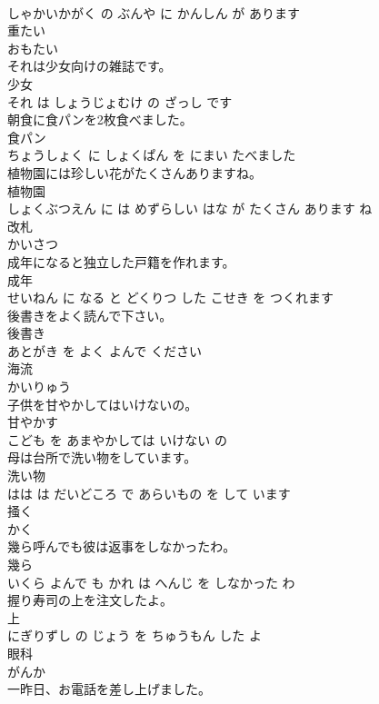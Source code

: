 \documentclass[8pt]{extreport}
\begin{document}
\begin{CJK}{UTF8}{min}
\\	しゃかいかがく の ぶんや に かんしん が あります			
\\	重たい	
\\	おもたい		
\\	それは少女向けの雑誌です。	
\\	少女 
\\	それ は しょうじょむけ の ざっし です			
\\	朝食に食パンを2枚食べました。	
\\	食パン 
\\	ちょうしょく に しょくぱん を にまい たべました			
\\	植物園には珍しい花がたくさんありますね。	
\\	植物園 
\\	しょくぶつえん に は めずらしい はな が たくさん あります ね			
\\	改札	
\\	かいさつ		
\\	成年になると独立した戸籍を作れます。	
\\	成年 
\\	せいねん に なる と どくりつ した こせき を つくれます			
\\	後書きをよく読んで下さい。	
\\	後書き 
\\	あとがき を よく よんで ください			
\\	海流	
\\	かいりゅう		
\\	子供を甘やかしてはいけないの。	
\\	甘やかす 
\\	こども を あまやかしては いけない の			
\\	母は台所で洗い物をしています。	
\\	洗い物 
\\	はは は だいどころ で あらいもの を して います			
\\	掻く	
\\	かく		
\\	幾ら呼んでも彼は返事をしなかったわ。	
\\	幾ら 
\\	いくら よんで も かれ は へんじ を しなかった わ			
\\	握り寿司の上を注文したよ。	
\\	上 
\\	にぎりずし の じょう を ちゅうもん した よ			
\\	眼科	
\\	がんか		
\\	一昨日、お電話を差し上げました。	

\end{CJK}
\end{document}
